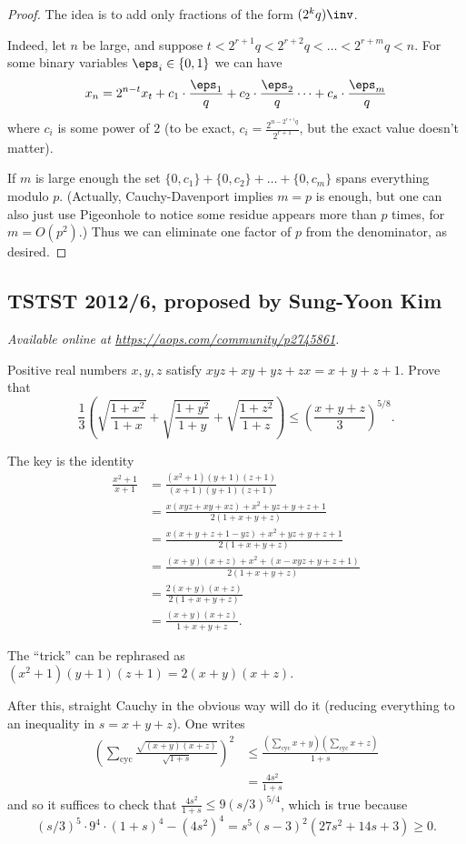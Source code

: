 \documentclass[11pt]{scrartcl}
\begin{document}
\begin{proof}
The idea is to add only fractions of the form $(2^k q)\inv$.

Indeed, let $n$ be large,
and suppose $t < 2^{r+1} q < 2^{r+2} q < \dots < 2^{r+m} q < n$.
For some binary variables $\eps_i \in \{0,1\}$ we can have
\[ x_n = 2^{n-t} x_t
  + c_1 \cdot \frac{\eps_1}{q}
  + c_2 \cdot \frac{\eps_2}{q}
  \dots
  + c_s \cdot \frac{\eps_m}{q}
\]
where $c_i$ is some power of $2$
(to be exact, $c_i = \frac{2^{n-2^{r+i}q}}{2^{r+1}}$,
but the exact value doesn't matter).

If $m$ is large enough the set $\{0,c_1\} + \{0,c_2\} + \dots + \{0, c_m\}$
spans everything modulo $p$.
(Actually, Cauchy-Davenport implies $m=p$ is enough,
but one can also just use Pigeonhole to notice some residue appears
more than $p$ times, for $m = O(p^2)$.)
Thus we can eliminate one factor of $p$ from the denominator, as desired.
\end{proof}
\pagebreak

\subsection{TSTST 2012/6, proposed by Sung-Yoon Kim}
\textsl{Available online at \url{https://aops.com/community/p2745861}.}
\begin{mdframed}[style=mdpurplebox,frametitle={Problem statement}]
Positive real numbers $x, y, z$ satisfy $xyz+xy+yz+zx = x+y+z+1$.
Prove that
\[ \frac{1}{3} \left( \sqrt{\frac{1+x^2}{1+x}}
  + \sqrt{\frac{1+y^2}{1+y}}
  + \sqrt{\frac{1+z^2}{1+z}} \right)
  \le \left( \frac{x+y+z}{3} \right)^{5/8} . \]
\end{mdframed}
The key is the identity
\begin{align*}
  \frac{x^2+1}{x+1} &= \frac{(x^2+1)(y+1)(z+1)}{(x+1)(y+1)(z+1)} \\
  &= \frac{x(xyz+xy+xz)+x^2+yz+y+z+1}{2(1+x+y+z)} \\
  &= \frac{x(x+y+z+1-yz) + x^2+yz+y+z+1}{2(1+x+y+z)} \\
  &= \frac{(x+y)(x+z) + x^2 + \left( x-xyz+y+z+1 \right)}{2(1+x+y+z)} \\
  &= \frac{2(x+y)(x+z)}{2(1+x+y+z)} \\
  &= \frac{(x+y)(x+z)}{1+x+y+z}.
\end{align*}
\begin{remark*}
  The ``trick'' can be rephrased as
  $(x^2+1)(y+1)(z+1) = 2(x+y)(x+z)$.
\end{remark*}
After this, straight Cauchy in the obvious way will do it
(reducing everything to an inequality in $s = x+y+z$).
One writes
\begin{align*}
  \left( \sum_{\text{cyc}} \frac{\sqrt{(x+y)(x+z)}}{\sqrt{1+s}} \right)^2
  &\le \frac{\left( \sum_{\text{cyc}} x+y \right)
    \left( \sum_{\text{cyc}} x+z \right)}{1+s} \\
  &= \frac{4s^2}{1+s}
\end{align*}
and so it suffices to check that $\frac{4s^2}{1+s} \le 9(s/3)^{5/4}$,
which is true because
\[ (s/3)^5 \cdot 9^4 \cdot (1+s)^4 - (4s^2)^4
  = s^5 (s-3)^2 (27s^2 + 14s + 3) \ge 0. \]
\pagebreak
\end{document}
